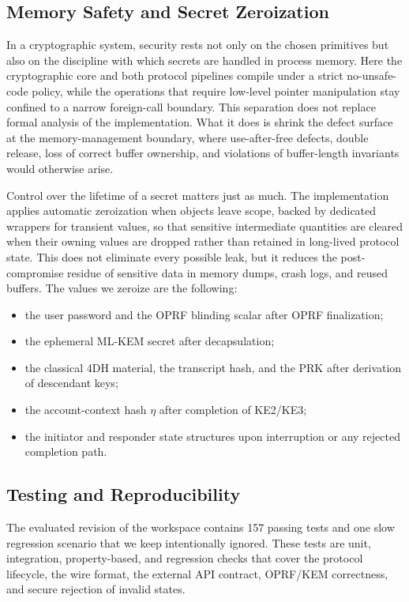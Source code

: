 \documentclass{ieeeijc}
\newcommand{\codeid}[1]{\textsf{#1}}
\theoremstyle{remark}
\begin{document}
\subsection{Memory Safety and Secret Zeroization}

In a cryptographic system, security rests not only on the chosen
primitives but also on the discipline with which secrets are handled in
process memory. Here the cryptographic core and both protocol pipelines
compile under a strict no-\codeid{unsafe}-code policy, while the
operations that require low-level pointer manipulation stay confined to a
narrow foreign-call boundary. This separation does not replace formal
analysis of the implementation. What it does is shrink the defect
surface at the memory-management boundary, where use-after-free defects,
double release, loss of correct buffer ownership, and violations of
buffer-length invariants would otherwise arise.

Control over the lifetime of a secret matters just as much. The
implementation applies automatic zeroization when objects leave scope,
backed by dedicated wrappers for transient values, so that sensitive
intermediate quantities are cleared when their owning values are dropped
rather than retained in long-lived protocol state. This does not eliminate every possible leak, but it
reduces the post-compromise residue of sensitive data in memory dumps,
crash logs, and reused buffers. The values we zeroize are the
following:
\begin{itemize}
  \item the user password and the OPRF blinding scalar after OPRF
        finalization;
  \item the ephemeral ML-KEM secret after decapsulation;
  \item the classical 4DH material, the transcript hash, and the PRK
        after derivation of descendant keys;
  \item the account-context hash $\eta$ after completion of
        KE2/KE3;
  \item the initiator and responder state structures upon interruption
        or any rejected completion path.
\end{itemize}

\subsection{Testing and Reproducibility}

The evaluated revision of the workspace contains 157 passing tests and
one slow regression scenario that we keep intentionally ignored. These tests
are unit, integration, property-based, and regression checks that cover
the protocol lifecycle, the wire format, the external API contract,
OPRF/KEM correctness, and secure rejection of invalid states.
\end{document}
